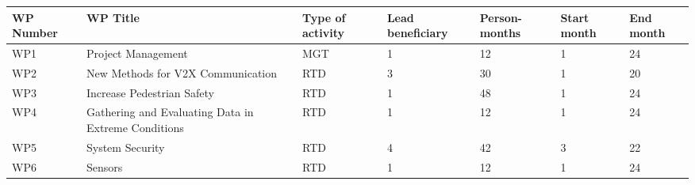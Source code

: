 \documentclass{article}
\begin{document}
\begin{table}[]
    \centering
    \begin{adjustbox}{width=\textwidth}
        \begin{tabular}{|l|l|l|l|l|l|l|}
            \hline
            \textbf{WP Number} & \textbf{WP Title}                                   & \textbf{Type of activity} & \textbf{Lead beneficiary} & \textbf{Person-months} & \textbf{Start month} & \textbf{End month} \\ \hline
            WP1                & Project Management                                  & MGT                       & 1                         & 12                     & 1                    & 24                 \\ \hline
            WP2                & New Methods for V2X Communication                   & RTD                       & 3                         & 30                     & 1                    & 20                 \\ \hline
            WP3                & Increase Pedestrian Safety                          & RTD                       & 1                         & 48                     & 1                    & 24                 \\ \hline
            WP4                & Gathering and Evaluating Data in Extreme Conditions & RTD                       & 1                         & 12                     & 1                    & 24                 \\ \hline
            WP5                & System Security                                     & RTD                       & 4                         & 42                     & 3                    & 22                 \\ \hline
            WP6                & Sensors                                             & RTD                       & 1                         & 12                     & 1                    & 24                 \\ \hline
        \end{tabular}
    \end{adjustbox}
\end{table}
\end{document}
